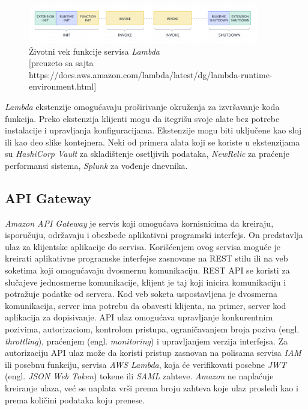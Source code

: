 \documentclass[12pt,oneside]{memoir}
\begin{document}
\begin{figure}[!ht]
  \centering
  \includegraphics[width=0.9\textwidth]{AWS-Lambda-zivotnivek.png}
  \caption{Životni vek funkcije servisa \emph{Lambda}\\\footnotesize[preuzeto sa sajta https://docs.aws.amazon.com/lambda/latest/dg/lambda-runtime-environment.html]}
  \label{fig:awsLambdaZivotniVek}
\end{figure}


\emph{Lambda} ekstenzije omogućavaju proširivanje okruženja za izvršavanje koda funkcija. Preko ekstenzija klijenti mogu da itegrišu svoje alate bez potrebe instalacije i upravljanja konfiguracijama. Ekstenzije mogu biti uključene kao sloj ili kao deo slike kontejnera. Neki od primera alata koji se koriste u ekstenzijama su \emph{HashiCorp Vault} za skladištenje osetljivih podataka, \emph{NewRelic} za praćenje performansi sistema, \emph{Splunk} za vođenje dnevnika.

\subsection{API Gateway}
  
\emph{Amazon API Gateway} je servis koji omogućava kornisnicima da kreiraju, isporučuju, održavaju i obezbede aplikativni programski interfejs. On predstavlja ulaz za klijentske aplikacije do servisa. Korišćenjem ovog servisa moguće je kreirati aplikativne programske interfejse zasnovane na REST stilu ili na veb soketima koji omogućavaju dvosmernu komunikaciju. REST API se koristi za slučajeve jednosmerne komunikacije, klijent je taj koji inicira komunikaciju i potražuje podatke od servera. Kod veb soketa uspostavljena je dvosmerna komunikacija, server ima potrebu da obavesti klijenta, na primer, server kod aplikacija za dopisivanje. API ulaz omogućava upravljanje konkurentnim pozivima, autorizaciom, kontrolom pristupa, ograničavanjem broja poziva (engl. \emph{throttling}), praćenjem (engl. \emph{monitoring}) i upravljanjem verzija interfejsa. Za autorizaciju API ulaz može da koristi pristup zasnovan na polisama servisa \emph{IAM} ili posebnu funkciju, servisa \emph{AWS Lambda}, koja će verifikovati posebne \emph{JWT} (engl. \emph{JSON Web Token}) tokene ili \emph{SAML} zahteve. \emph{Amazon} ne naplaćuje kreiranje ulaza, već se naplata vrši prema broju zahteva koje ulaz prosledi kao i prema količini podataka koju prenese. 
  
\end{document}
